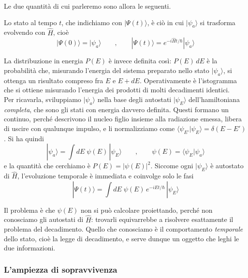 Le due quantità di cui parleremo sono allora le seguenti. 

Lo stato al tempo $t$, che indichiamo con $|\Psi(t)\rangle$, è ciò in cui $|\psi_a\rangle$ si trasforma evolvendo con $\hat{H}$, cioè
%
\begin{equation*}
    |\Psi(0)\rangle = |\psi_a\rangle \qquad , \qquad |\Psi(t)\rangle = e^{-i\hat{H}t/\hbar} |\psi_a\rangle
\end{equation*}

La distribuzione in energia $P(E)$ è invece definita così: $P(E)\,dE$ è la probabilità che, misurando l'energia del sistema preparato nello stato $|\psi_a\rangle$, si ottenga un risultato compreso fra $E$ e $E + dE$. Operativamente è l'istogramma che si ottiene misurando l'energia dei prodotti di molti decadimenti identici.\\

Per ricavarla, sviluppiamo $|\psi_a\rangle$ nella base degli autostati $|\psi_E\rangle$ dell'hamiltoniana \emph{completa}, che sono gli stati con energia davvero definita. Questi formano un continuo, perché descrivono il nucleo figlio insieme alla radiazione emessa, libera di uscire con qualunque impulso, e li normalizziamo come $\langle \psi_{E'} | \psi_E\rangle = \delta(E-E')$. Si ha quindi
%
\begin{equation}
    |\psi_a\rangle = \int dE \; \psi(E) \, |\psi_E\rangle \qquad , \qquad \psi(E) = \langle \psi_E | \psi_a \rangle
    \label{eq:sviluppo_energia}
\end{equation}
e la quantità che cerchiamo è $P(E) = |\psi(E)|^2$. Siccome ogni $|\psi_E\rangle$ è autostato di $\hat{H}$, l'evoluzione temporale è immediata e coinvolge solo le fasi
%
\begin{equation}
    |\Psi(t)\rangle = \int dE \; \psi(E) \, e^{-iEt/\hbar} \, |\psi_E\rangle
    \label{eq:evoluzione}
\end{equation}

Il problema è che $\psi(E)$ non si può calcolare proiettando, perché non conosciamo gli autostati di $\hat{H}$: trovarli equivarrebbe a risolvere esattamente il problema del decadimento. Quello che conosciamo è il comportamento \emph{temporale} dello stato, cioè la legge di decadimento, e serve dunque un oggetto che leghi le due informazioni.

\subsubsection*{L'ampiezza di sopravvivenza}

